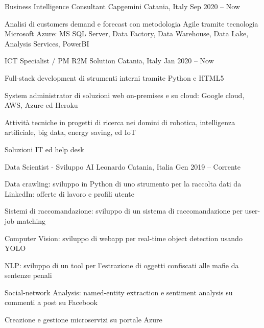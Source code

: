 
  \begin{cventries}
    \cventry
    {Business Intelligence Consultant}
    {Capgemini}    
    {Catania, Italy}
    {Sep 2020 -- Now}
    {
      \begin{cvitems}
        \item {
          Analisi di customers demand e forecast con metodologia Agile tramite tecnologia Microsoft Azure: 
          MS SQL Server, Data Factory, Data Warehouse, Data Lake, Analysis Services, PowerBI
        }
      \end{cvitems}
    }

    \cventry
    {ICT Specialist / PM}
    {R2M Solution}    
    {Catania, Italy}
    {Jan 2020 -- Now}
    {
      \begin{cvitems}
        \item {Full-stack development di strumenti interni tramite Python e HTML5}
        \item {System administrator di soluzioni web on-premises e su cloud: Google cloud, AWS, Azure ed Heroku}
        \item {Attività tecniche in progetti di ricerca nei domini di robotica, intelligenza artificiale, big data, energy saving, ed IoT}
        \item {Soluzioni IT ed help desk}
      \end{cvitems}
    }

    \cventry
    {Data Scientist - Sviluppo AI}
    {Leonardo}    
    {Catania, Italia}
    {Gen 2019 -- Corrente}
    {
      \begin{cvitems}
        \item {Data crawling: sviluppo in Python di uno strumento per la raccolta dati da LinkedIn: offerte di lavoro e profili utente}
        \item {Sistemi di raccomandazione: sviluppo di un sistema di raccomandazione per user-job matching}
        \item {Computer Vision: sviluppo di webapp per real-time object detection usando YOLO}
        \item {NLP: sviluppo di un tool per l'estrazione di oggetti confiscati alle mafie da sentenze penali}
        \item {Social-network Analysis: named-entity extraction e sentiment analysis su commenti a post su Facebook}
        \item {Creazione e gestione microservizi su portale Azure}
      \end{cvitems}
    }


\end{cventries}

